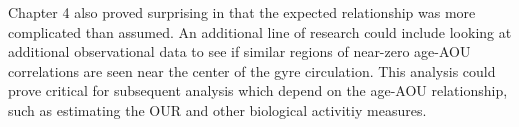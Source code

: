 Chapter 4 also proved surprising in that the expected relationship was more complicated
than assumed. An additional line of research could include looking at additional
observational data to see if similar regions of near-zero age-AOU correlations
are seen near the center of the gyre circulation. This analysis could prove critical
for subsequent analysis which depend on the age-AOU relationship, such as estimating
the OUR and other biological activitiy measures.





